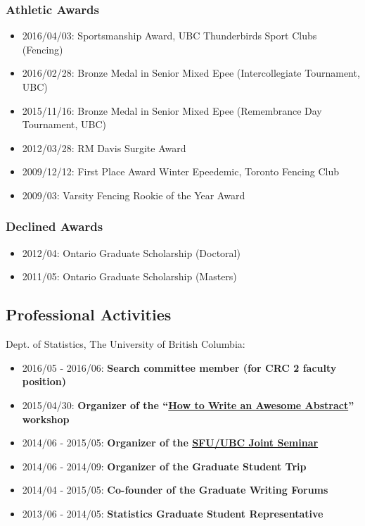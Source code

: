 \documentclass[]{article}
\providecommand{\tightlist}{%
  \setlength{\itemsep}{0pt}\setlength{\parskip}{0pt}}
\begin{document}
\hypertarget{athletic-awards}{%
\subsubsection{Athletic Awards}\label{athletic-awards}}

\begin{itemize}
\tightlist
\item
  2016/04/03: Sportsmanship Award, UBC Thunderbirds Sport Clubs (Fencing)
\item
  2016/02/28: Bronze Medal in Senior Mixed Epee (Intercollegiate Tournament, UBC)
\item
  2015/11/16: Bronze Medal in Senior Mixed Epee (Remembrance Day Tournament, UBC)
\item
  2012/03/28: RM Davis Surgite Award
\item
  2009/12/12: First Place Award Winter Epeedemic, Toronto Fencing Club
\item
  2009/03: Varsity Fencing Rookie of the Year Award
\end{itemize}

\hypertarget{declined-awards}{%
\subsubsection{Declined Awards}\label{declined-awards}}

\begin{itemize}
\tightlist
\item
  2012/04: Ontario Graduate Scholarship (Doctoral)
\item
  2011/05: Ontario Graduate Scholarship (Masters)
\end{itemize}

\hypertarget{professional-activities}{%
\subsection{Professional Activities}\label{professional-activities}}

Dept. of Statistics, The University of British Columbia:

\begin{itemize}
\tightlist
\item
  2016/05 - 2016/06: \textbf{Search committee member (for CRC 2 faculty position)}
\item
  2015/04/30: \textbf{Organizer of the ``\href{http://stat.ubc.ca/~vincen.coia/abstractworkshop.html}{How to Write an Awesome Abstract}'' workshop}
\item
  2014/06 - 2015/05: \textbf{Organizer of the \href{http://stat.ubc.ca/~vincen.coia/seminar.html}{SFU/UBC Joint Seminar}}
\item
  2014/06 - 2014/09: \textbf{Organizer of the Graduate Student Trip}
\item
  2014/04 - 2015/05: \textbf{Co-founder of the Graduate Writing Forums}
\item
  2013/06 - 2014/05: \textbf{Statistics Graduate Student Representative}
\end{itemize}
\end{document}
